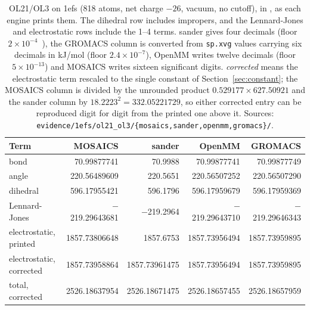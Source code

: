\begin{table}[t]
\centering
\small
\setlength{\tabcolsep}{5pt}
\caption{OL21/OL3 on 1efs (818 atoms, net charge $-26$, vacuum, no cutoff), in
\kcal{}, as each engine prints them. The dihedral row includes impropers, and the
Lennard-Jones and electrostatic rows include the 1--4 terms. sander gives four
decimals (floor $2\times10^{-4}$~\kcal{}), the GROMACS column is converted from
\texttt{sp.xvg} values carrying six decimals in kJ/mol (floor
$2.4\times10^{-7}$), OpenMM writes twelve decimals (floor $5\times10^{-13}$)
and MOSAICS writes sixteen significant digits. \emph{corrected} means the
electrostatic term rescaled to the single constant of
Section~\ref{sec:constant}; the MOSAICS column is divided by the unrounded
product $0.529177\times627.50921$ and the sander column by
$18.2223^{2}=332.05221729$, so either corrected entry can be reproduced digit
for digit from the printed one above it. Sources:
\texttt{evidence/1efs/ol21\_ol3/\{mosaics,sander,openmm,gromacs\}/}.}
\label{tab:ol21}
\begin{tabular}{@{}lrrrr@{}}
\toprule
Term & MOSAICS & sander & OpenMM & GROMACS \\
\midrule
bond                   &   70.99877741 &   70.9988    &   70.99877741 &   70.99877749 \\
angle                  &  220.56489609 &  220.5651    &  220.56507252 &  220.56507290 \\
dihedral               &  596.17955421 &  596.1796    &  596.17959679 &  596.17959369 \\
Lennard-Jones          & $-$219.29643681 & $-$219.2964 & $-$219.29643710 & $-$219.29646343 \\
electrostatic, printed & 1857.73806648 & 1857.6753    & 1857.73956494 & 1857.73959895 \\
electrostatic, corrected & 1857.73958864 & 1857.73961475 & 1857.73956494 & 1857.73959895 \\
\midrule
total, corrected       & 2526.18637954 & 2526.18671475 & 2526.18657455 & 2526.18657959 \\
\bottomrule
\end{tabular}
\end{table}

